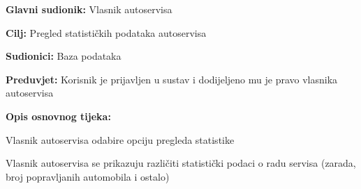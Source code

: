\noindent {}
\begin{packed_item}
	
	\item \textbf{Glavni sudionik: } Vlasnik autoservisa
	\item  \textbf{Cilj:} Pregled statističkih podataka autoservisa
	\item  \textbf{Sudionici:} Baza podataka
	\item  \textbf{Preduvjet:} Korisnik je prijavljen u sustav i dodijeljeno
	mu je pravo vlasnika autoservisa
	\item  \textbf{Opis osnovnog tijeka:}
	
	\item[] \begin{packed_enum}
		
		\item Vlasnik autoservisa odabire opciju pregleda statistike
		\item Vlasnik autoservisa se prikazuju različiti statistički podaci o radu servisa (zarada, broj popravljanih automobila i ostalo)
		
	\end{packed_enum}
\end{packed_item}

